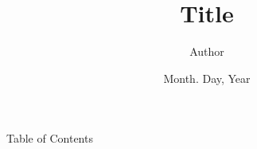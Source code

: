 \documentclass[t, aspectratio=43, dvipdfmx, 10pt]{beamer}
\title{Title}
\author{Author}
\date{Month. Day, Year}
\begin{document}
\begin{frame}[t, noframenumbering]
	\thispagestyle{empty}
	\titlepage
\end{frame}

\begin{frame}[noframenumbering]{Table of Contents}
    \tableofcontents
\end{frame}


%     
%     
\end{document}
